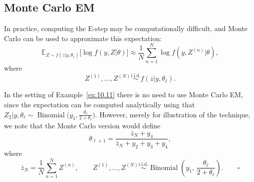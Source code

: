 \subsection*{Monte Carlo EM}

In practice, computing the E-step may be computationally difficult, and Monte Carlo can be used to
approximate this expectation:
\[
  \mathbb{E}_{Z \sim f(z|y,\theta_\ell)}\!\bigl[\log f(y, Z|\theta)\bigr]
  \approx \frac{1}{N} \sum_{n=1}^{N} \log f(y, Z^{(n)}|\theta),
\]
where
\[
  Z^{(1)}, \ldots, Z^{(N)} \overset{\mathrm{i.i.d.}}{\sim} f(z|y, \theta_\ell).
\]

\begin{example}
  \label{ex:10.12}
  In the setting of Example~\ref{ex:10.11} there is no need to use Monte Carlo EM, since the
  expectation can be computed analytically using that
  $Z_2|y,\theta_\ell \sim \operatorname{Binomial}\!\bigl(y_1, \tfrac{\theta_\ell}{2+\theta_\ell}\bigr)$.
  However, merely for illustration of the technique, we note that the Monte Carlo version would
  define
  \[
    \theta_{\ell+1} = \frac{\bar{z}_N + y_4}{\bar{z}_N + y_2 + y_3 + y_4},
  \]
  where
  \[
    \bar{z}_N = \frac{1}{N}\sum_{n=1}^{N} Z^{(n)},
    \qquad
    Z^{(1)}, \ldots, Z^{(N)} \overset{\mathrm{i.i.d.}}{\sim}
    \operatorname{Binomial}\!\left(y_1,\, \frac{\theta_\ell}{2+\theta_\ell}\right). \qquad\square
  \]
\end{example}
